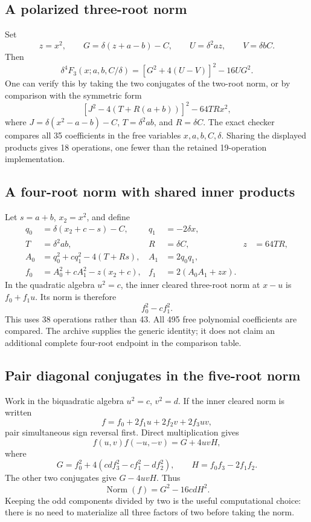 \documentclass[11pt,letterpaper]{article}
\theoremstyle{definition}
\theoremstyle{remark}
\begin{document}
\subsection{A polarized three-root norm}

Set
\[
 z=x^2,\qquad G=\delta(z+a-b)-C,\qquad
 U=\delta^2az,\qquad V=\delta bC.
\]
Then
\begin{equation}\label{eq:norm3}
 \delta^4 F_3(x;a,b,C/\delta)
                  =[G^2+4(U-V)]^2-16UG^2.
\end{equation}
One can verify this by taking the two conjugates of the two-root norm,
or by comparison with the symmetric form
\[
 [J^2-4(T+R(a+b))]^2-64TRx^2,
\]
where $J=\delta(x^2-a-b)-C$, $T=\delta^2ab$, and $R=\delta C$.
The exact checker compares all 35 coefficients in the free variables
$x,a,b,C,\delta$. Sharing the displayed products gives 18 operations,
one fewer than the retained 19-operation implementation.

\subsection{A four-root norm with shared inner products}

Let $s=a+b$, $x_2=x^2$, and define
\begin{align*}
 q_0&=\delta(x_2+c-s)-C,&q_1&=-2\delta x,\\
 T&=\delta^2ab,&R&=\delta C,&z&=64TR,\\
 A_0&=q_0^2+cq_1^2-4(T+Rs),&A_1&=2q_0q_1,\\
 f_0&=A_0^2+cA_1^2-z(x_2+c),&f_1&=2(A_0A_1+zx).
\end{align*}
In the quadratic algebra $u^2=c$, the inner cleared three-root norm
at $x-u$ is $f_0+f_1u$. Its norm is therefore
\[
                              f_0^2-cf_1^2.
\]
This uses 38 operations rather than 43. All 495 free polynomial
coefficients are compared. The archive supplies the generic identity;
it does not claim an additional complete four-root endpoint in the
comparison table.

\subsection{Pair diagonal conjugates in the five-root norm}

Work in the biquadratic algebra $u^2=c$, $v^2=d$. If the inner
cleared norm is written
\[
                    f=f_0+2f_1u+2f_2v+2f_3uv,
\]
pair simultaneous sign reversal first. Direct multiplication gives
\[
 f(u,v)f(-u,-v)=G+4uvH,
\]
where
\[
 G=f_0^2+4(cd f_3^2-cf_1^2-df_2^2),\qquad
 H=f_0f_3-2f_1f_2.
\]
The other two conjugates give $G-4uvH$. Thus
\begin{equation}\label{eq:norm5core}
                  \operatorname{Norm}(f)=G^2-16cdH^2.
\end{equation}
Keeping the odd components divided by two is the useful computational
choice: there is no need to materialize all three factors of two before
taking the norm.
\end{document}
